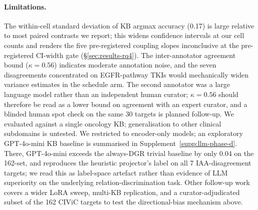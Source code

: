 \paragraph{Limitations.}
The within-cell standard deviation of KB argmax accuracy (0.17)
is large relative to most paired contrasts we report; this widens
confidence intervals at our cell counts and renders the five
pre-registered coupling slopes inconclusive at the pre-registered
CI-width gate (\S\ref{sec:results-rq4}). The inter-annotator
agreement bound (\(\kappa=0.56\)) indicates moderate annotation
noise, and the seven disagreements concentrated on EGFR-pathway
TKIs would mechanically widen variance estimates in the schedule
arm. The second annotator was a large language model rather than an
independent human curator; \(\kappa=0.56\) should therefore be read
as a lower bound on agreement with an expert curator, and a
blinded human spot check on the same 30 targets is planned
follow-up. We evaluated against a single oncology KB;
generalisation to other clinical subdomains is untested. We
restricted to encoder-only models; an exploratory GPT-4o-mini KB baseline is summarised in Supplement~\ref{supp:llm-phase-d}.
There, GPT-4o-mini exceeds the always-DGR trivial baseline by only 0.04 on the 162-set, and reproduces the heuristic projector's label on all 7 IAA-disagreement targets; we read this as label-space artefact rather than evidence of LLM superiority on the underlying relation-discrimination task.
Other
follow-up work covers a wider LoRA sweep, multi-KB replication,
and a curator-adjudicated subset of the 162 CIViC targets to test
the directional-bias mechanism above.

